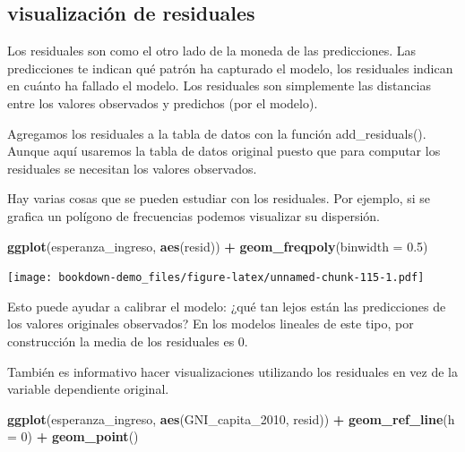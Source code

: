 \documentclass[]{book}
\newenvironment{Shaded}{\begin{snugshade}}{\end{snugshade}}
\newcommand{\KeywordTok}[1]{\textcolor[rgb]{0.13,0.29,0.53}{\textbf{#1}}}
\newcommand{\DataTypeTok}[1]{\textcolor[rgb]{0.13,0.29,0.53}{#1}}
\newcommand{\DecValTok}[1]{\textcolor[rgb]{0.00,0.00,0.81}{#1}}
\newcommand{\FloatTok}[1]{\textcolor[rgb]{0.00,0.00,0.81}{#1}}
\newcommand{\StringTok}[1]{\textcolor[rgb]{0.31,0.60,0.02}{#1}}
\newcommand{\OperatorTok}[1]{\textcolor[rgb]{0.81,0.36,0.00}{\textbf{#1}}}
\newcommand{\NormalTok}[1]{#1}
\theoremstyle{definition}
\theoremstyle{definition}
\theoremstyle{definition}
\theoremstyle{remark}
\begin{document}
\subsection{visualización de
residuales}\label{visualizacion-de-residuales}

Los residuales son como el otro lado de la moneda de las predicciones.
Las predicciones te indican qué patrón ha capturado el modelo, los
residuales indican en cuánto ha fallado el modelo. Los residuales son
simplemente las distancias entre los valores observados y predichos (por
el modelo).

Agregamos los residuales a la tabla de datos con la función
add\_residuals(). Aunque aquí usaremos la tabla de datos original puesto
que para computar los residuales se necesitan los valores observados.

\begin{Shaded}
\end{Shaded}

Hay varias cosas que se pueden estudiar con los residuales. Por ejemplo,
si se grafica un polígono de frecuencias podemos visualizar su
dispersión.

\begin{Shaded}
\begin{Highlighting}[]
\KeywordTok{ggplot}\NormalTok{(esperanza_ingreso, }\KeywordTok{aes}\NormalTok{(resid)) }\OperatorTok{+}\StringTok{ }
\StringTok{  }\KeywordTok{geom_freqpoly}\NormalTok{(}\DataTypeTok{binwidth =} \FloatTok{0.5}\NormalTok{)}
\end{Highlighting}
\end{Shaded}

\texttt{[image: bookdown-demo\_files/figure-latex/unnamed-chunk-115-1.pdf]}

Esto puede ayudar a calibrar el modelo: ¿qué tan lejos están las
predicciones de los valores originales observados? En los modelos
lineales de este tipo, por construcción la media de los residuales es 0.

También es informativo hacer visualizaciones utilizando los residuales
en vez de la variable dependiente original.

\begin{Shaded}
\begin{Highlighting}[]
\KeywordTok{ggplot}\NormalTok{(esperanza_ingreso, }\KeywordTok{aes}\NormalTok{(GNI_capita_}\DecValTok{2010}\NormalTok{, resid)) }\OperatorTok{+}\StringTok{ }
\StringTok{  }\KeywordTok{geom_ref_line}\NormalTok{(}\DataTypeTok{h =} \DecValTok{0}\NormalTok{) }\OperatorTok{+}
\StringTok{  }\KeywordTok{geom_point}\NormalTok{() }
\end{Highlighting}
\end{Shaded}
\end{document}
